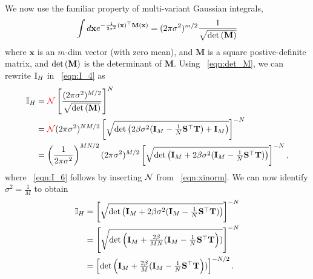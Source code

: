We now use the familiar property of multi-variant Gaussian integrals,
\begin{align}
\label{eqn:det_M}
\int d\mathbf{x}  e^{-\frac{1}{2\sigma^{2}}(\mathbf{x})^{\top}\mathbf{M}(\mathbf{x}) } = (2\pi\sigma^{2})^{m/2}\frac{1}{\sqrt{\mbox{}{\text{det}}\left( \mathbf{M}\right)}}
\end{align}
where $\mathbf{x}$ is an $m$-dim vector (with zero mean),
and $\mathbf{M}$ is a square postive-definite matrix, and $\mbox{}{\text{det}}\left( \mathbf{M}\right)$ is the determinant of $\mathbf{M}$.
%
Using \EQN~\ref{eqn:det_M}, we can rewrite $\mathbb{I}_{H}$ in \EQN~\ref{eqn:I_4} as
\begin{align}
\label{eqn:I_5}
\mathbb{I}_{H} &=   {\color{red}\sf{\mathcal{N}}}\left[\frac{(2\pi\sigma^{2})^{M/2}}{\sqrt{\mbox{}{\text{det}}\left( \mathbf{M}\right)}}\right]^{N} \\ \nonumber
    &=   {\color{red}\sf{\mathcal{N}}}(2\pi\sigma^2)^{NM/2}\left[
         \sqrt{\mbox{}{\text{det}}\left( 2\beta\sigma^2(\mathbf{I}_{M}-\tfrac{1}{N}{\mathbf{S}}^{\top}{\mathbf{T}})+\mathbf{I}_{M}\right)}\right]^{-N}  \\
\label{eqn:I_6}
   &=  \left( \frac{1}{2\pi\sigma^{2}} \right)^{MN/2}
       (2\pi \sigma^{2})^{M/2}
         \left[\sqrt{\mbox{}{\text{det}}\left( \mathbf{I}_{M} + 2\beta\sigma^{2}(\mathbf{I}_{M}-\tfrac{1}{N}{\mathbf{S}}^{\top}{\mathbf{T}})\right)}\right]^{-N}  ,
\end{align}
where \EQN~\ref{eqn:I_6} follows by inserting $\mathcal{N}$ from \EQN~\ref{eqn:xinorm}.
We can now identify $\sigma^{2}=\tfrac{1}{M}$ to obtain
\begin{align}
\nonumber
\mathbb{I}_{H} &= \left[\sqrt{\mbox{}{\text{det}}\left( \mathbf{I}_{M} + 2\beta\sigma^{2}(\mathbf{I}_{M}-\tfrac{1}{N}{\mathbf{S}}^{\top}{\mathbf{T}})\right)}\right]^{-N}   \\ 
\nonumber
    &= \left[\sqrt{\mbox{}{\text{det}}\left( \mathbf{I}_{M}  + \tfrac{2\beta}{MN}(\mathbf{I}_{M}-\tfrac{1}{N}{\mathbf{S}}^{\top}{\mathbf{T}}\right))}\right]^{-N} \\ 
\label{eqn:I_7}
    &= \left[\mbox{}{\text{det}}\left( \mathbf{I}_{M}  + \tfrac{2\beta}{M}(\mathbf{I}_{M}-\tfrac{1}{N}{\mathbf{S}}^{\top}{\mathbf{T}}\right))\right]^{-N/2}  .
\end{align}


